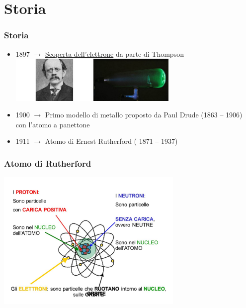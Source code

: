 \section{Storia} %
	\label{sec:storia}
	
	\begin{frame}[t]\frametitle{Storia}
		\begin{itemize}
			\item 1897 $\longrightarrow$ \href{http://www.wired.it/scienza/energia/2014/04/30/la-scoperta-dellelettrone/}{Scoperta dell'elettrone} da parte di Thompson 
			\includegraphics[width=4cm]{./img/thompson.jpg}
			\includegraphics[width=4cm]{./img/tubo.jpg}
			\pause
			\item 1900  $\longrightarrow$ Primo modello di metallo proposto da Paul Drude (1863 – 1906) con l'atomo a panettone
			
			\pause
			\item 1911  $\longrightarrow$ Atomo di Ernest Rutherford ( 1871 – 1937)
		\end{itemize}
	\end{frame}

	\begin{frame}[c]\frametitle{Atomo di Rutherford}
	    
		\centering \includegraphics[width=9cm]{./img/atomo.jpg}

	\end{frame}

